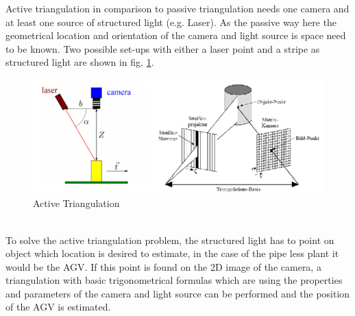 Active triangulation in comparison to passive triangulation needs one camera and at least one source of structured light (e.g. Laser). As the passive way here the geometrical location and orientation of the camera and light source is space need to be known. Two possible set-ups with either a laser point and a stripe as structured light are shown in fig. \ref{ative_Triangulation}.
\begin{figure}[!htbp]
\centering
\includegraphics[width = 16cm]{Pictures/acticetriangulation}
\caption{Active Triangulation}
\label{ative_Triangulation}
\end{figure}\\
To solve the active triangulation problem, the structured light has to point on object which location is desired to estimate, in the case of the pipe less plant it would be the AGV. If this point is found on the 2D image of the camera, a triangulation with basic trigonometrical formulas which are using the properties and parameters of the camera and light source can be performed and the position of the AGV is estimated. 
\pagebreak
